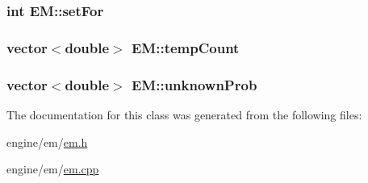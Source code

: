 \label{classEM_abb7e20d53630eb8b692084ba1cf666c5}
\hypertarget{classEM_a138450b0d00acac64fd8a272b999be9f}{
\subsubsection[{setFor}]{\setlength{\rightskip}{0pt plus 5cm}int {\bf EM::setFor}}}
\label{classEM_a138450b0d00acac64fd8a272b999be9f}
\hypertarget{classEM_ae28d8a79298bd3b15801f4eff84216b1}{
\subsubsection[{tempCount}]{\setlength{\rightskip}{0pt plus 5cm}vector$<$double$>$ {\bf EM::tempCount}}}
\label{classEM_ae28d8a79298bd3b15801f4eff84216b1}
\hypertarget{classEM_adc712759a9c74b26826ffbc28d4cf410}{
\subsubsection[{unknownProb}]{\setlength{\rightskip}{0pt plus 5cm}vector$<$double$>$ {\bf EM::unknownProb}}}
\label{classEM_adc712759a9c74b26826ffbc28d4cf410}


The documentation for this class was generated from the following files:\begin{DoxyCompactItemize}
\item 
engine/em/\hyperlink{em_8h}{em.h}\item 
engine/em/\hyperlink{em_8cpp}{em.cpp}\end{DoxyCompactItemize}
